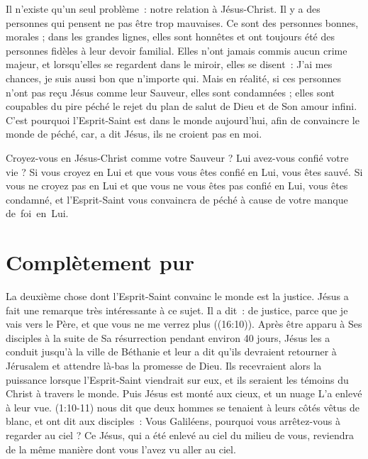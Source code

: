 Il n'existe qu'un seul problème~: notre relation à Jésus-Christ.
 Il y a des personnes qui pensent ne pas être trop mauvaises.
 Ce sont des personnes bonnes, morales ; dans les grandes lignes,
 elles sont honnêtes et ont toujours été des personnes fidèles
 à leur devoir familial. Elles n'ont jamais commis aucun crime majeur,
 et lorsqu'elles se regardent dans le miroir, elles se disent~:
 \og  J'ai mes chances, je suis aussi bon que n'importe qui. \fg{}
 Mais en réalité, si ces personnes n'ont pas reçu Jésus comme leur Sauveur,
 elles sont condamnées ; elles sont coupables du pire péché
 \ocadr le rejet du plan de salut de Dieu et de Son amour infini.
 C'est pourquoi l'Esprit-Saint est dans le monde aujourd'hui,
 afin de convaincre le monde de péché,
 \og car, a dit Jésus, ils ne croient pas en moi. \fg{}

Croyez-vous en Jésus-Christ comme votre Sauveur ?
 Lui avez-vous confié votre vie ? Si vous croyez en Lui et que vous vous êtes
 confié en Lui, vous êtes sauvé.
 Si vous ne croyez pas en Lui et que vous ne vous êtes pas confié en Lui,
 vous êtes condamné, et l'Esprit-Saint vous convaincra de péché
 à cause de votre manque de~foi~en~Lui. %


\section{Compl\`etement pur}

La deuxième chose dont l'Esprit-Saint convainc le monde est la justice.
 Jésus a fait une remarque très intéressante à ce sujet. Il a dit~:
 \og [\dots{}] de justice, parce que je vais vers le Père,
 et que vous ne me verrez plus \fg{} ((16:10)).
 Après être apparu à Ses disciples à la suite de Sa résurrection
 pendant environ 40 jours, Jésus les a conduit jusqu'à la ville
 de Béthanie et leur a dit qu'ils devraient retourner à Jérusalem
 et attendre là-bas la promesse de Dieu.
 Ils recevraient alors la puissance lorsque l'Esprit-Saint viendrait sur eux,
 et ils seraient les témoins du Christ à travers le monde.
 Puis Jésus est monté aux cieux, et un nuage L'a enlevé à leur vue.
 (1:10-11) nous dit que deux hommes se tenaient à leurs côtés
 vêtus de blanc, et ont dit aux disciples~:
 \og Vous Galiléens, pourquoi vous arrêtez-vous à regarder au ciel ?
 Ce Jésus, qui a été enlevé au ciel du milieu de vous,
 reviendra de la même manière dont vous l'avez vu aller au ciel. \fg{}


